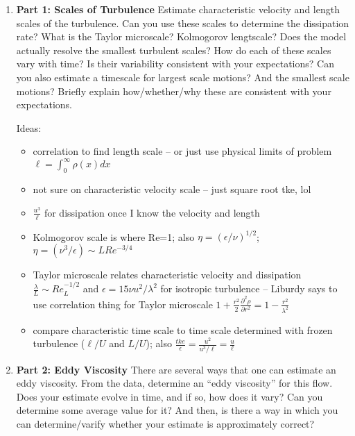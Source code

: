 \documentclass[11pt]{article}
\begin{document}
\begin{enumerate}

    \item \textbf{Part 1: Scales of Turbulence} Estimate characteristic velocity and length scales of the turbulence. Can you use these scales to determine the dissipation rate? What is the Taylor microscale? Kolmogorov lengtscale? Does the model actually resolve the smallest turbulent scales? How do each of these scales vary with time? Is their variability consistent with your expectations? Can you also estimate a timescale for largest scale motions? And the smallest scale motions? Briefly explain how/whether/why these are consistent with your expectations.\par
    
    Ideas:
    \begin{itemize}
        \item correlation to find length scale -- or just use physical limits of problem $\ell = \int_0^{\infty}\rho(x)dx$
        \item not sure on characteristic velocity scale -- just square root tke, lol
        \item $\frac{u^3}{\ell}$ for dissipation once I know the velocity and length
        \item Kolmogorov scale is where Re=1; also $\eta=\left( \epsilon/\nu \right)^{1/2}$; $\eta=\left(\nu^3/\epsilon\right)\sim L Re^{-3/4}$
        \item Taylor microscale relates characteristic velocity and dissipation $\frac{\lambda}{L} \sim Re_L^{-1/2}$ and $\epsilon = 15\nu u^2 / \lambda^2$ for isotropic turbulence -- Liburdy says to use correlation thing for Taylor microscale $1+\frac{r^2}{2}\frac{\partial^2\rho}{\partial r^2} = 1-\frac{r^2}{\lambda^2}$
        \item compare characteristic time scale to time scale determined with frozen turbulence ($\ell/U$ and $L/U$); also $\frac{tke}{\epsilon}=\frac{u^2}{u^3/\ell}=\frac{u}{\ell}$
    \end{itemize}
    

    \item \textbf{Part 2: Eddy Viscosity} There are several ways that one can estimate an eddy viscosity. From the data, determine an ``eddy viscosity'' for this flow. Does your estimate evolve in time, and if so, how does it vary? Can you determine some average value for it? And then, is there a way in which you can determine/varify whether your estimate is approximately correct?
    

\end{enumerate}
\end{document}
